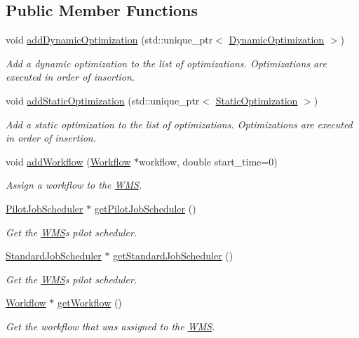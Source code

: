 \subsection*{Public Member Functions}
\begin{DoxyCompactItemize}
\item 
void \hyperlink{classwrench_1_1_w_m_s_a036f0865c72e8dfe4e40b9419f0dc735}{add\+Dynamic\+Optimization} (std\+::unique\+\_\+ptr$<$ \hyperlink{classwrench_1_1_dynamic_optimization}{Dynamic\+Optimization} $>$)
\begin{DoxyCompactList}\small\item\em Add a dynamic optimization to the list of optimizations. Optimizations are executed in order of insertion. \end{DoxyCompactList}\item 
void \hyperlink{classwrench_1_1_w_m_s_a21b9ae8ef40ba22e5ef0052fb70f7731}{add\+Static\+Optimization} (std\+::unique\+\_\+ptr$<$ \hyperlink{classwrench_1_1_static_optimization}{Static\+Optimization} $>$)
\begin{DoxyCompactList}\small\item\em Add a static optimization to the list of optimizations. Optimizations are executed in order of insertion. \end{DoxyCompactList}\item 
void \hyperlink{classwrench_1_1_w_m_s_afd2a6ae2f4d792046a6a17d5c0dc313f}{add\+Workflow} (\hyperlink{classwrench_1_1_workflow}{Workflow} $\ast$workflow, double start\+\_\+time=0)
\begin{DoxyCompactList}\small\item\em Assign a workflow to the \hyperlink{classwrench_1_1_w_m_s}{W\+MS}. \end{DoxyCompactList}\item 
\hyperlink{classwrench_1_1_pilot_job_scheduler}{Pilot\+Job\+Scheduler} $\ast$ \hyperlink{classwrench_1_1_w_m_s_ab84692140428dd81a6eccc115bf557e7}{get\+Pilot\+Job\+Scheduler} ()
\begin{DoxyCompactList}\small\item\em Get the \hyperlink{classwrench_1_1_w_m_s}{W\+MS}\textquotesingle{}s pilot scheduler. \end{DoxyCompactList}\item 
\hyperlink{classwrench_1_1_standard_job_scheduler}{Standard\+Job\+Scheduler} $\ast$ \hyperlink{classwrench_1_1_w_m_s_ae350b1268c2122d5094852d3b6241e7a}{get\+Standard\+Job\+Scheduler} ()
\begin{DoxyCompactList}\small\item\em Get the \hyperlink{classwrench_1_1_w_m_s}{W\+MS}\textquotesingle{}s pilot scheduler. \end{DoxyCompactList}\item 
\hyperlink{classwrench_1_1_workflow}{Workflow} $\ast$ \hyperlink{classwrench_1_1_w_m_s_a44b586fe5f584755375691a12d815aa3}{get\+Workflow} ()
\begin{DoxyCompactList}\small\item\em Get the workflow that was assigned to the \hyperlink{classwrench_1_1_w_m_s}{W\+MS}. \end{DoxyCompactList}\end{DoxyCompactItemize}
